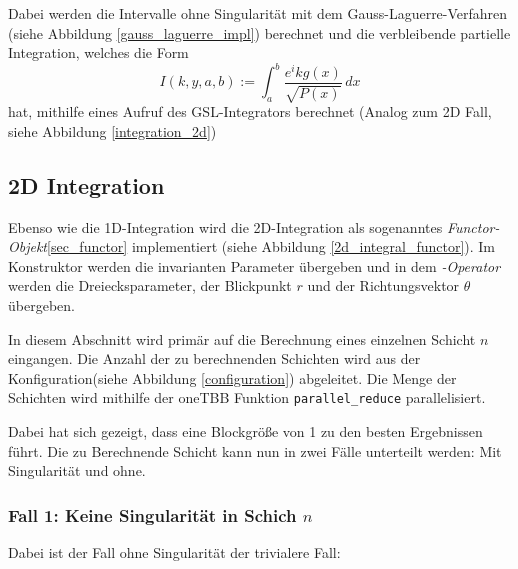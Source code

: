 Dabei werden die Intervalle ohne Singularität mit dem Gauss-Laguerre-Verfahren (siehe Abbildung \ref{gauss_laguerre_impl}) berechnet und die verbleibende partielle Integration,
welches die Form
\begin{equation*}
    I(k,y,a,b) := \int_{a}^{b}  \frac{e^ikg(x)}{\sqrt{P(x)}} \,dx 
\end{equation*}
hat, mithilfe eines Aufruf des GSL-Integrators berechnet (Analog zum 2D Fall, siehe Abbildung \ref{integration_2d})



\subsection{2D Integration}\label{2dint}

Ebenso wie die 1D-Integration wird die 2D-Integration als sogenanntes \textit{Functor-Objekt}\ref{sec_functor} implementiert (siehe Abbildung \ref{2d_integral_functor}). 
Im Konstruktor werden die invarianten Parameter übergeben und in dem \textit{\(\)-Operator} werden die Dreiecksparameter, der Blickpunkt $r$ und der Richtungsvektor $\theta$ übergeben.

In diesem Abschnitt wird primär auf die Berechnung eines einzelnen Schicht $n$ eingangen. Die Anzahl der zu berechnenden Schichten wird aus der Konfiguration(siehe Abbildung \ref{configuration}) abgeleitet. 
Die Menge der Schichten wird mithilfe der oneTBB Funktion \texttt{parallel\_reduce} parallelisiert.

\begin{center}
    
    \label{2d_integral_parallel}
\end{center}

Dabei hat sich gezeigt, dass eine Blockgröße von 1 zu den besten Ergebnissen führt.
Die zu Berechnende Schicht kann nun in zwei Fälle unterteilt werden: Mit Singularität und ohne.

\subsubsection*{Fall 1: Keine Singularität in Schich $n$}

Dabei ist der Fall ohne Singularität der trivialere Fall:

\begin{center}
    
    \label{2d_integral_trivial}
\end{center}


